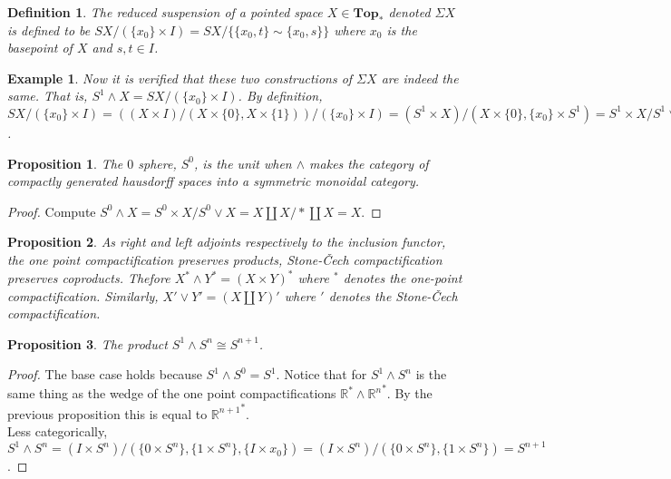 \documentclass{article}
\theoremstyle{problemstyle}
\theoremstyle{problemstyle}
\newtheorem{definition}{Definition}
\theoremstyle{problemstyle}
\newtheorem{example}{Example}
\theoremstyle{problemstyle}
\theoremstyle{problemstyle}
\newtheorem{proposition}{Proposition}
\theoremstyle{problemstyle}
\begin{document}
\begin{definition}
The reduced suspension of a pointed space $X \in \textbf{Top}_*$ denoted $\Sigma X$ is defined to be $SX/(\{x_0\} \times I) = SX/\{\{x_0,t\}\sim\{x_0,s\}\}$ where $x_0$ is the basepoint of $X$ and $s,t \in I$.
\end{definition}

\begin{example}
Now it is verified that these two constructions of $\Sigma X$ are indeed the same. 
That is, $S^1 \wedge X = SX/(\{x_0\} \times I)$. By definition, $SX/(\{x_0\} \times I) = ((X\times I)/(X \times\{0\}, X \times \{1\}))/(\{x_0\} \times I) = (S^1 \times X)/(X \times \{0\}, \{x_0\} \times S^1) = S^1 \times X/ S^1 \vee X = S^1 \wedge X$.  
\end{example}

\begin{proposition}
The $0$ sphere, $S^0$, is the unit when $\wedge$ makes the category of compactly generated hausdorff spaces into a symmetric monoidal category.
\end{proposition}

\begin{proof}
Compute $S^0 \wedge X = S^0 \times X/ S^0 \vee X = X\coprod X/*\coprod X = X$. 
\end{proof}

\begin{proposition}
As right and left adjoints respectively to the inclusion functor, the one point compactification preserves products, Stone-Čech compactification preserves coproducts. Thefore $X^* \wedge Y^* = (X \times Y)^*$ where $^*$ denotes the one-point compactification. Similarly, $X' \vee Y' = (X \coprod Y)'$ where $'$ denotes the Stone-Čech compactification. 
\end{proposition}

\begin{proposition}
The product $S^1 \wedge S^n \cong S^{n+1}$. 
\end{proposition}
\begin{proof}
The base case holds because $S^1 \wedge S^0 = S^1$. Notice that for $S^1 \wedge S^n$ is the same thing as the wedge of the one point compactifications $\mathbb{R}^* \wedge {\mathbb{R}^n}^*$. By the previous proposition this is equal to ${\mathbb{R}^{n+1}}^*$.\\
Less categorically, $S^1 \wedge S^n = (I \times S^n)/(\{0 \times S^n\},\{1 \times S^n\}, \{I \times x_0\}) = (I \times S^n)/(\{0 \times S^n\},\{1 \times S^n\}) = S^{n+1}$.   
\end{proof}
\end{document}
